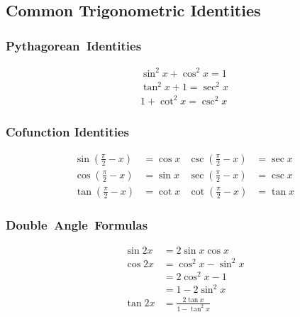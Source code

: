 \subsection{Common Trigonometric Identities}

\noindent%
\begin{minipage}[t]{.25\linewidth}
	\subsubsection*{Pythagorean~Identities}
	\begin{align*}
		\sin ^2x+\cos ^2x= 1 \\
		\tan^2x+ 1 = \sec^2 x \\
		1 + \cot^2x=\csc^2 x
	\end{align*}
\end{minipage}%
\begin{minipage}[t]{.45\linewidth}
	\subsubsection*{Cofunction Identities}
	\begin{align*}
		\sin\left(\frac{\pi}{2}-x\right) &= \cos x &
		\csc\left(\frac{\pi}{2}-x\right) &= \sec x \\
		\cos\left(\frac{\pi}{2}-x\right) &= \sin x &
		\sec\left(\frac{\pi}{2}-x\right) &= \csc x \\
		\tan\left(\frac{\pi}{2}-x\right) &= \cot x &
		\cot\left(\frac{\pi}{2}-x\right) &= \tan x
	\end{align*}
\end{minipage}%
\begin{minipage}[t]{.25\linewidth}
	\subsubsection*{Double~Angle~Formulas}
	\begin{align*}
		\sin 2x &= 2\sin x\cos x \\
		\cos 2x &= \cos^2x - \sin^2 x \\
		&= 2\cos^2x-1 \\
		&= 1-2\sin^2x \\
		\tan 2x &= \frac{2\tan x}{1-\tan^2 x}
	\end{align*}
\end{minipage}

\bigskip

